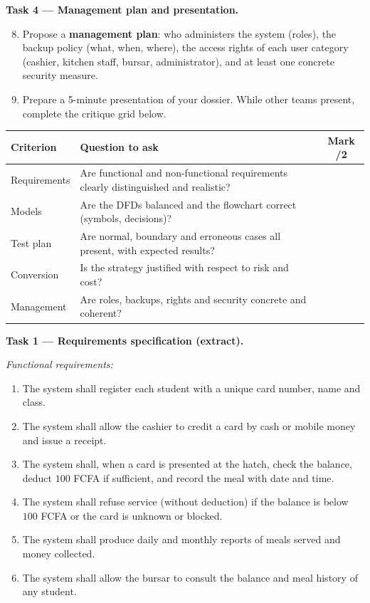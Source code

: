 \documentclass[11pt]{article}
\newcounter{popsec}
\newcounter{popsub}
\newcommand{\courssub}[1]{%
  \stepcounter{popsub}%
  \par\vspace{9pt}\noindent{\popxbold\fontsize{11.5}{13}\selectfont\color{popink}{\color{poporange}\thepopsec.\thepopsub}\hspace{6pt}#1}\par\nopagebreak\vspace{4pt}
}
\begin{document}
\textbf{Task 4 — Management plan and presentation.}

\begin{enumerate}
\setcounter{enumi}{7}
\item Propose a \textbf{management plan}: who administers the system (roles), the backup policy (what, when, where), the access rights of each user category (cashier, kitchen staff, bursar, administrator), and at least one concrete security measure.
\item Prepare a 5-minute presentation of your dossier. While other teams present, complete the critique grid below.
\end{enumerate}

\begin{center}
\begin{tabularx}{\linewidth}{|l|X|c|}
\hline
\rowcolor{popblueL} \textbf{Criterion} & \textbf{Question to ask} & \textbf{Mark /2} \\
\hline
Requirements & Are functional and non-functional requirements clearly distinguished and realistic? & \\
\hline
Models & Are the DFDs balanced and the flowchart correct (symbols, decisions)? & \\
\hline
Test plan & Are normal, boundary and erroneous cases all present, with expected results? & \\
\hline
Conversion & Is the strategy justified with respect to risk and cost? & \\
\hline
Management & Are roles, backups, rights and security concrete and coherent? & \\
\hline
\end{tabularx}
\end{center}

\courssub{Model answer}

\textbf{Task 1 — Requirements specification (extract).}

\emph{Functional requirements:}
\begin{enumerate}
\item The system shall register each student with a unique card number, name and class.
\item The system shall allow the cashier to credit a card by cash or mobile money and issue a receipt.
\item The system shall, when a card is presented at the hatch, check the balance, deduct $100$ FCFA if sufficient, and record the meal with date and time.
\item The system shall refuse service (without deduction) if the balance is below $100$ FCFA or the card is unknown or blocked.
\item The system shall produce daily and monthly reports of meals served and money collected.
\item The system shall allow the bursar to consult the balance and meal history of any student.
\end{enumerate}
\end{document}
